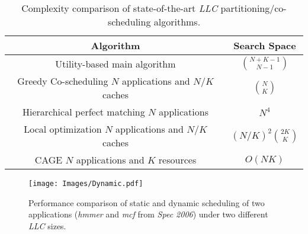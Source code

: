 \begin{table}[!tb] \scriptsize
\centering
\caption{\label{table:complexity} Complexity comparison of state-of-the-art \textit{LLC} partitioning/co-scheduling algorithms.}
\begin{tabular}{|c||c|} 
\hline Algorithm & Search Space\\
\hline Utility-based main algorithm \cite{qureshi2006utility} & $ \binom{N+K-1}{N-1}$  \\
\hline \pbox{20cm}{Greedy Co-scheduling \cite{jiang2008analysis}\\  $N$ applications and $N/K$ caches} & $ \binom{N}{K}  $ \\
\hline \pbox{20cm}{Hierarchical perfect matching \cite{jiang2008analysis} \\ $N$ applications} & $N^4 $ \\
\hline \pbox{20cm}{Local optimization \cite{jiang2008analysis} \\ $N$ applications and $N/K$ caches} & ${(N/K)}^2 \binom{2K}{K} $\\
\hline \pbox{20cm}{CAGE \\ $N$ applications and $K$ resources} & ${O(NK)}$\\
\hline
\end{tabular}
\end{table}
\begin{comment}
\begin{figure}%
\centering
\texttt{[image: Images/Complexity.pdf]}
\caption{\label{fig:complexity} Complexity comparison of state-of-the-art \textit{LLC} partitioning algorithms.}
\end{figure}
\end{comment}
\begin{figure}[!b]
\centering
\texttt{[image: Images/Dynamic.pdf]} %
\caption{\label{fig:Dynamic} Performance comparison of static and dynamic scheduling of two applications (\textit{hmmer} and \textit{mcf} from \textit{Spec 2006}) under two different \textit{LLC} sizes.}
\end{figure}
